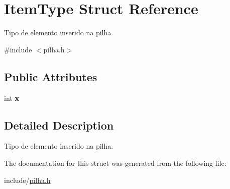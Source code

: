 \hypertarget{struct_item_type}{}\section{Item\+Type Struct Reference}
\label{struct_item_type}


Tipo de elemento inserido na pilha.  




{\ttfamily \#include $<$pilha.\+h$>$}

\subsection*{Public Attributes}
\begin{DoxyCompactItemize}
\item 
\mbox{\label{struct_item_type_ac607cb8d69e5763265e33fda4c1867a7}} 
int {\bfseries x}
\end{DoxyCompactItemize}


\subsection{Detailed Description}
Tipo de elemento inserido na pilha. 

The documentation for this struct was generated from the following file\+:\begin{DoxyCompactItemize}
\item 
include/\mbox{\hyperlink{pilha_8h}{pilha.\+h}}\end{DoxyCompactItemize}
